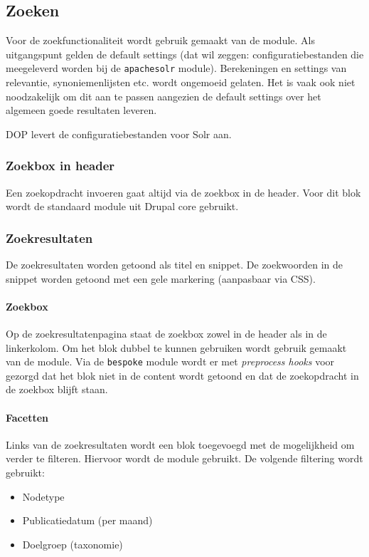 \subsection{Zoeken}\label{zoeken}
Voor de zoekfunctionaliteit wordt gebruik gemaakt van de  module. Als uitgangspunt gelden de default settings (dat wil zeggen: configuratiebestanden die meegeleverd worden bij de \texttt{apachesolr} module). Berekeningen en settings van relevantie, synoniemenlijsten etc. wordt ongemoeid gelaten. Het is vaak ook niet noodzakelijk om dit aan te passen aangezien de default settings over het algemeen goede resultaten leveren.

DOP levert de configuratiebestanden voor Solr aan.

\subsubsection{Zoekbox in header}
Een zoekopdracht invoeren gaat altijd via de zoekbox in de header. Voor dit blok wordt de standaard  module uit Drupal core gebruikt.

\subsubsection{Zoekresultaten}
De zoekresultaten worden getoond als titel en snippet. De zoekwoorden in de snippet worden getoond met een gele markering (aanpasbaar via CSS).

\paragraph{Zoekbox}
Op de zoekresultatenpagina staat de zoekbox zowel in de header als in de linkerkolom. Om het blok dubbel te kunnen gebruiken wordt gebruik gemaakt van de  module. Via de \texttt{bespoke} module wordt er met \emph{preprocess hooks} voor gezorgd dat het blok niet in de content wordt getoond en dat de zoekopdracht in de zoekbox blijft staan.

\paragraph{Facetten}
Links van de zoekresultaten wordt een blok toegevoegd met de mogelijkheid om verder te filteren. Hiervoor wordt de  module gebruikt. De volgende filtering wordt gebruikt:
\begin{itemize}
\item Nodetype
\item Publicatiedatum (per maand)
\item Doelgroep (taxonomie)
\end{itemize}

